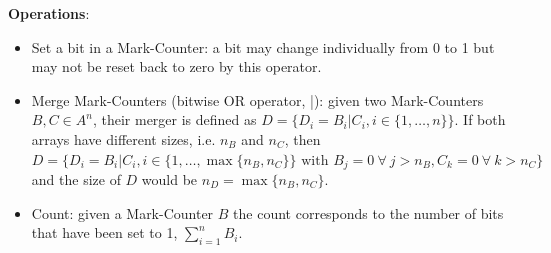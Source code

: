 {\bf Operations}:
\begin{itemize}
	\item Set a bit in a Mark-Counter: a bit may change individually from 0 to 1 but may not be reset back to zero by this operator.
	
	\item Merge Mark-Counters (bitwise OR operator, |): given two Mark-Counters $B, C \in A^{n}$, their merger is defined as $D = \{D_{i} = B_{i} | C_{i}, i \in \{1,\dots, n\}\}$. If both arrays have different sizes, i.e. $n_{B}$ and $n_{C}$, then $D = \{D_{i} = B_{i} | C_{i}, i \in \{1,\dots, \max{\{n_{B}, n_{C}\}}\} \text{ with } B_{j} = 0 ~ \forall ~ j > n_{B}, C_{k} = 0 ~ \forall ~ k > n_{C}\}$ and the size of $D$ would be $n_{D} = \max{\{n_{B}, n_{C}\}}$.
	
	\item Count: given a Mark-Counter $B$ the count corresponds to the number of bits that have been set to 1, $\sum^{n}_{i = 1} B_{i}$.
\end{itemize}


